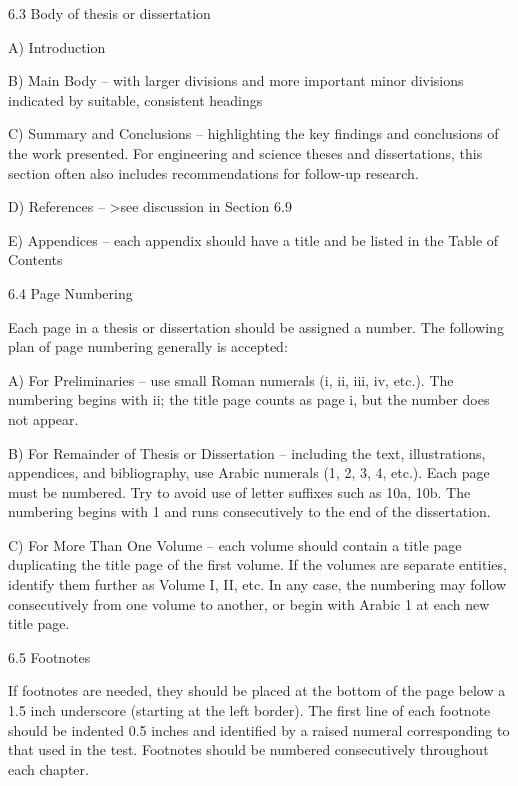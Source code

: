 \documentclass[12pt]{cmuthesis}
\begin{document}
 

6.3 Body of thesis or dissertation

A) Introduction

B) Main Body – with larger divisions and more important minor divisions indicated by suitable, consistent headings

C) Summary and Conclusions – highlighting the key findings and conclusions of the work presented. For engineering and science theses and dissertations, this section often also includes recommendations for follow-up research.

D) References – >see discussion in Section 6.9

E) Appendices – each appendix should have a title and be listed in the Table of Contents

 

6.4 Page Numbering

Each page in a thesis or dissertation should be assigned a number. The following plan of page numbering generally is accepted:

A) For Preliminaries – use small Roman numerals (i, ii, iii, iv, etc.). The numbering begins with ii; the title page counts as page i, but the number does not appear.

B) For Remainder of Thesis or Dissertation – including the text, illustrations, appendices, and bibliography, use Arabic numerals (1, 2, 3, 4, etc.). Each page must be numbered. Try to avoid use of letter suffixes such as 10a, 10b. The numbering begins with 1 and runs consecutively to the end of the dissertation.

C) For More Than One Volume – each volume should contain a title page duplicating the title page of the first volume. If the volumes are separate entities, identify them further as Volume I, II, etc. In any case, the numbering may follow consecutively from one volume to another, or begin with Arabic 1 at each new title page.

 

6.5 Footnotes

If footnotes are needed, they should be placed at the bottom of the page below a 1.5 inch underscore (starting at the left border). The first line of each footnote should be indented 0.5 inches and identified by a raised numeral corresponding to that used in the test. Footnotes should be numbered consecutively throughout each chapter.








\end{document}
